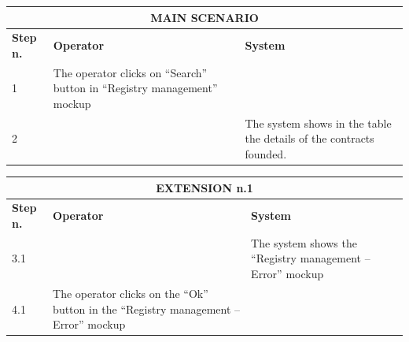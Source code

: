 {{{\begin{center}
			\begin{tabular}{|p{2cm}|p{6cm}|p{6cm}|}
			\hline
				\multicolumn{3}{|c|}{MAIN SCENARIO} \\
			\hline
				\centering \vspace{1mm} \bfseries{Step n.} \vspace{1mm} & \vspace{1mm} \bfseries{Operator} \vspace{1mm} & \vspace{1mm} \bfseries{System} \vspace{1mm}\\
			\hline
				\vspace{1mm} 1 \vspace{1mm} &
				\vspace{1mm} The operator clicks on “Search” button in “Registry management”  mockup \vspace{1mm} & 
				\vspace{1mm} \vspace{1mm} \\
			\hline
				\vspace{1mm} 2 \vspace{1mm} &
				\vspace{1mm} \vspace{1mm} & 
				\vspace{1mm} The system shows in the table the details of the contracts founded. \vspace{1mm} \\
			\hline
			\end{tabular}

			\begin{tabular}{|p{2cm}|p{6cm}|p{6cm}|}
			\hline
				\multicolumn{3}{|c|}{EXTENSION n.1} \\
			\hline
				\centering \vspace{1mm} \bfseries{Step n.} \vspace{1mm} & \vspace{1mm} \bfseries{Operator} \vspace{1mm} & \vspace{1mm} \bfseries{System} \vspace{1mm}\\
			\hline
				\vspace{1mm} 3.1 \vspace{1mm} &
				\vspace{1mm} \vspace{1mm} & 
				\vspace{1mm} The system shows the “Registry management – Error” mockup \vspace{1mm} \\
			\hline
				\vspace{1mm} 4.1 \vspace{1mm} &
				\vspace{1mm} The operator clicks on the “Ok” button in the “Registry management – Error” mockup \vspace{1mm} & 
				\vspace{1mm} \vspace{1mm} \\
			\hline
			\end{tabular}


\end{center}}}}
